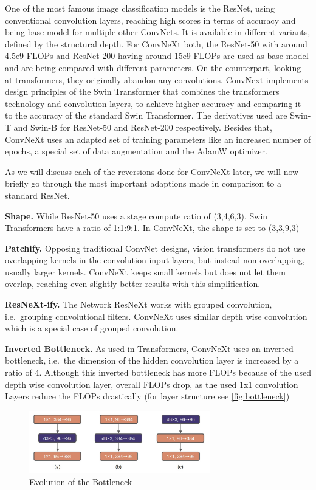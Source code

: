 \documentclass{article}
\begin{document}
One of the most famous image classification models is the ResNet, using conventional convolution layers, reaching high scores in terms of accuracy and being base model for multiple other ConvNets.
It is available in different variants, defined by the structural depth.
For ConvNeXt both, the ResNet-50 with around 4.5e9 FLOPs and ResNet-200 having around 15e9 FLOPs are used as base model and are being compared with different parameters.
On the counterpart, looking at transformers, they originally abandon any convolutions.
ConvNext implements design principles of the Swin Transformer that combines the transformers technology and convolution layers, to achieve higher accuracy and comparing it to the accuracy of the standard Swin Transformer.
The derivatives used are Swin-T and Swin-B for ResNet-50 and ResNet-200 respectively.
Besides that, ConvNeXt uses an adapted set of training parameters like an increased number of epochs, a special set of data augmentation and the AdamW optimizer.

As we will discuss each of the reversions done for ConvNeXt later, we will now briefly go through the most important adaptions made in comparison to a standard ResNet.

\textbf{Shape.}
While ResNet-50 uses a stage compute ratio of (3,4,6,3), Swin Transformers have a ratio of 1:1:9:1.
In ConvNeXt, the shape is set to (3,3,9,3)

\textbf{Patchify.}
Opposing traditional ConvNet designs, vision transformers do not use overlapping kernels in the convolution input layers, but instead non overlapping, usually larger kernels.
ConvNeXt keeps small kernels but does not let them overlap, reaching even slightly better results with this simplification.

\textbf{ResNeXt-ify.}
The Network ResNeXt works with grouped convolution, i.e.\ grouping convolutional filters.
ConvNeXt uses similar depth wise convolution which is a special case of grouped convolution.

\textbf{Inverted Bottleneck.}
As used in Transformers, ConvNeXt uses an inverted bottleneck, i.e.\ the dimension of the hidden convolution layer is increased by a ratio of 4.
Although this inverted bottleneck has more FLOPs because of the used depth wise convolution layer, overall FLOPs drop, as the used 1x1 convolution Layers reduce the FLOPs drastically (for layer structure see \autoref{fig:bottleneck})
\begin{figure}[h]
    \centering
    \includegraphics[width=0.7\textwidth]{images/bottleneck}
    \caption{Evolution of the Bottleneck\cite{liu2022convnet}}
    \label{fig:bottleneck}
\end{figure}
\end{document}
